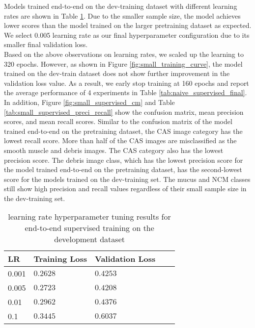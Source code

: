 \documentclass[12pt,twoside]{report}
\begin{document}
Models trained end-to-end on the dev-training dataset with different learning rates are shown in Table \ref{tab:small_supervised_tuning}. Due to the smaller sample size, the model achieves lower scores than the model trained on the larger pretraining dataset as expected. We select 0.005 learning rate as our final hyperparameter configuration due to its smaller final validation loss. \\

Based on the above observations on learning rates, we scaled up the learning to 320 epochs. However, as shown in Figure \ref{fig:small_training_curve}, the model trained on the dev-train dataset does not show further improvement in the validation loss value. As a result, we early stop training at 160 epochs and report the average performance of 4 experiments in Table \ref{tab:naive_supervised_final}. In addition, Figure \ref{fig:small_supervised_cm} and Table \ref{tab:small_supervised_preci_recall} show the confusion matrix, mean precision scores, and mean recall scores. Similar to the confusion matrix of the model trained end-to-end on the pretraining dataset, the CAS image category has the lowest recall score. More than half of the CAS images are misclassified as the smooth muscle and debris images. The CAS category also has the lowest precision score. The debris image class, which has the lowest precision score for the model trained end-to-end on the pretraining dataset, has the second-lowest score for the models trained on the dev-training set. The mucus and NCM classes still show high precision and recall values regardless of their small sample size in the dev-training set.\\

\begin{table}[]
    \centering
    \begin{tabular}{lllll}
    \toprule
    LR & Training Loss & Validation Loss \\
    \midrule
    0.001 & $0.2628$ & $0.4253$ \\
    0.005 & $0.2723$ & $0.4208$ \\
    0.01  & $0.2962$ & $0.4376$ \\
    0.1   & $0.3445$ & $0.6037$ \\
    \bottomrule
    \end{tabular}
    \caption{learning rate hyperparameter tuning results for end-to-end supervised training on the development dataset}
    \label{tab:small_supervised_tuning}
\end{table}
\end{document}
